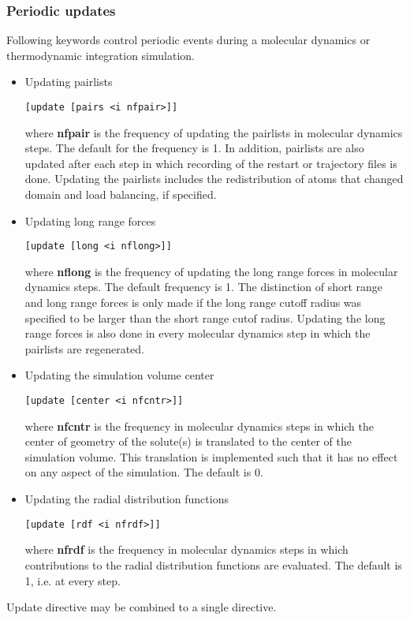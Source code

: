 \subsubsection{Periodic updates}
Following keywords control periodic events during a molecular
dynamics or thermodynamic integration simulation.
\begin{itemize}
\item
Updating pairlists
\begin{verbatim}
[update [pairs <i nfpair>]]
\end{verbatim}
where {\bf nfpair} is the frequency of updating the pairlists in
molecular dynamics steps. The default for the frequency is 1.
In addition, pairlists are also updated after each step in which
recording of the restart or trajectory files is done. Updating
the pairlists includes the redistribution of atoms that changed
domain and load balancing, if specified.
\item
Updating long range forces
\begin{verbatim}
[update [long <i nflong>]]
\end{verbatim}
where {\bf nflong} is the frequency of updating the long range
forces in molecular dynamics steps. The default frequency is 1.
The distinction of short range and long range forces is only
made if the long range cutoff radius was specified to be larger
than the short range cutof radius. Updating the long range forces
is also done in every molecular dynamics step in which the
pairlists are regenerated.
\item
Updating the simulation volume center
\begin{verbatim}
[update [center <i nfcntr>]]
\end{verbatim}
where {\bf nfcntr} is the frequency in molecular dynamics steps in 
which the center of geometry of the solute(s) is translated to the
center of the simulation volume. This translation is implemented
such that it has no effect on any aspect of the simulation. The
default is 0.
\item
Updating the radial distribution functions
\begin{verbatim}
[update [rdf <i nfrdf>]]
\end{verbatim}
where {\bf nfrdf} is the frequency in molecular dynamics steps in 
which contributions to the radial distribution functions are
evaluated. The default is 1, i.e. at every step.
\end{itemize}
Update directive may be combined to a single directive.
